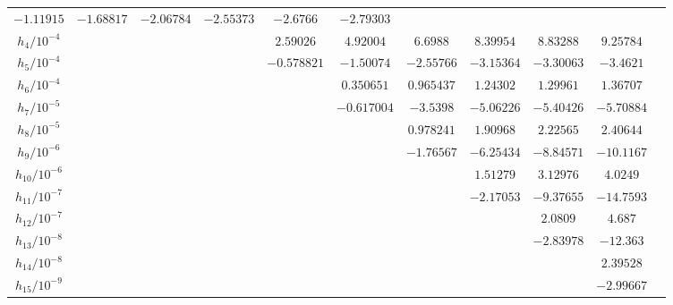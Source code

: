 \documentclass[
  aps,
  pre,
  preprint,
  longbibliography,
  floatfix
]{revtex4-2}
\begin{document}
\begin{table}
\begin{tabular}{c|cccccccccc}
      $-1.11915$ &
      $-1.68817$ &
      $-2.06784$ &
      $-2.55373$ &
      $-2.6766$ &
      $-2.79303$ &
                \\
    $h_4/10^{-4}$ & & & &
      $2.59026$ &
      $4.92004$ &
      $6.6988$ &
      $8.39954$ &
      $8.83288$ &
      $9.25784$ &
                \\
    $h_5/10^{-4}$ & & & &
      $-0.578821$ &
      $-1.50074$ &
      $-2.55766$ &
      $-3.15364$ &
      $-3.30063$ &
      $-3.4621$ &
                \\
    $h_6/10^{-4}$ & & & & &
      $0.350651$ &
      $0.965437$ &
      $1.24302$ &
      $1.29961$ &
      $1.36707$ &
                \\
    $h_7/10^{-5}$ & & & & &
      $-0.617004$ &
      $-3.5398$ &
      $-5.06226$ &
      $-5.40426$ &
      $-5.70884$ &
                \\
    $h_8/10^{-5}$ & & & & & &
      $0.978241$ &
      $1.90968$ &
      $2.22565$ &
      $2.40644$ &
                \\
    $h_9/10^{-6}$ & & & & & &
      $-1.76567$ &
      $-6.25434$ &
      $-8.84571$ &
      $-10.1167$ &
                \\
    $h_{10}/10^{-6}$ & & & & & & &
      $1.51279$ &
      $3.12976$ &
      $4.0249$ &
                \\
    $h_{11}/10^{-7}$ & & & & & & &
      $-2.17053$ &
      $-9.37655$ &
      $-14.7593$ &
                \\
    $h_{12}/10^{-7}$ & & & & & & & &
      $2.0809$ &
      $4.687$ &
                \\
    $h_{13}/10^{-8}$ & & & & & & & &
      $-2.83978$ &
      $-12.363$ &
                \\
    $h_{14}/10^{-8}$ & & & & & & & & &
      $2.39528$ &
                \\
    $h_{15}/10^{-9}$ & & & & & & & & &
      $-2.99667$ &
                \\
  \end{tabular}
\end{table}
\end{document}
